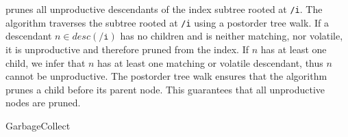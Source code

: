 \documentclass[abstracton,12pt]{scrartcl}
\theoremstyle{definition}
\begin{document}
 prunes all
unproductive descendants of the index subtree rooted at \texttt{/i}. The algorithm traverses
the subtree rooted at \texttt{/i} using a postorder tree walk. If a descendant $n \in
desc(\texttt{/i})$ has no children and is neither matching, nor
volatile, it is unproductive and therefore pruned from the index. If $n$ has at least
one child, we infer
that $n$ has at least one matching or volatile descendant, thus $n$ cannot be
unproductive. The postorder tree walk ensures
that the algorithm prunes a child before its parent node. This guarantees that
all unproductive nodes are pruned.

\begin{algorithm}
  \caption{GarbageCollect}
  \DontPrintSemicolon
  \label{algo:periodic_gc_wapi}
\end{algorithm}

\vspace{-1cm}
\end{document}
